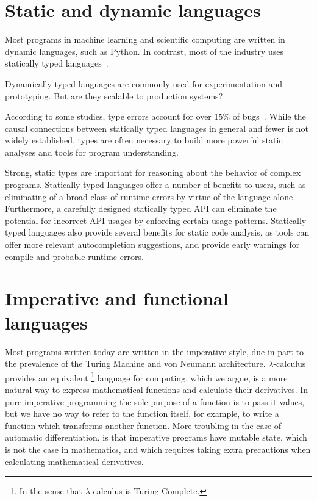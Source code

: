 \documentclass[12pt,initial,twoside,maitrise]{dms}
\numberwithin{equation}{section}
\numberwithin{table}{chapter}
\numberwithin{figure}{chapter}
\begin{document}
\section{Static and dynamic languages}

Most programs in machine learning and scientific computing are written in dynamic languages, such as Python. In contrast, most of the industry uses statically typed languages~\cite{github}.

Dynamically typed languages are commonly used for experimentation and prototyping. But are they scalable to production systems?

According to some studies, type errors account for over 15\% of bugs~\cite{gao2017type}. While the causal connections between statically typed languages in general and fewer is not widely established, types are often necessary to build more powerful static analyses and tools for program understanding.

Strong, static types are important for reasoning about the behavior of complex programs. Statically typed languages offer a number of benefits to users, such as eliminating of a broad class of runtime errors by virtue of the language alone. Furthermore, a carefully designed statically typed API can eliminate the potential for incorrect API usages by enforcing certain usage patterns. Statically typed languages also provide several benefits for static code analysis, as tools can offer more relevant autocompletion suggestions, and provide early warnings for compile and probable runtime errors.

\section{Imperative and functional languages}

Most programs written today are written in the imperative style, due in part to the prevalence of the Turing Machine and von Neumann architecture. $\lambda$-calculus provides an equivalent \footnote{In the sense that $\lambda$-calculus is Turing Complete.} language for computing, which we argue, is a more natural way to express mathematical functions and calculate their derivatives. In pure imperative programming the sole purpose of a function is to pass it values, but we have no way to refer to the function itself, for example, to write a function which transforms another function. More troubling in the case of automatic differentiation, is that imperative programs have mutable state, which is not the case in mathematics, and which requires taking extra precautions when calculating mathematical derivatives.
\end{document}
